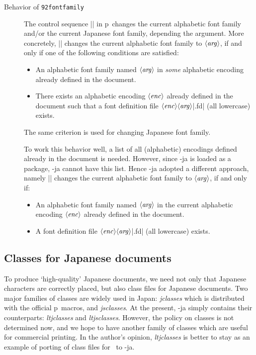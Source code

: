 \documentclass{ajt}
\begin{document}
\begin{description}

\item[Behavior of\/ {\tt\char92fontfamily\/}]
The control sequence |\fontfamily| in p\LaTeXe\ changes the current alphabetic
	   font family and/or the current Japanese font family,
	   depending the argument. More concretely,
	   || changes the
	   current alphabetic font family to $\langle\hbox{\it
	   arg\/}\rangle$, if and only if one of the following
	   conditions are satisfied:
\begin{itemize}
\item An alphabetic font family named $\langle\hbox{\it arg\/}\rangle$ in
      \emph{some} alphabetic encoding already defined in the document.
\item There exists an alphabetic encoding $\langle\hbox{\it
      enc\/}\rangle$ already defined in the document such that a font
      definition file $\langle\hbox{\it enc\/}\rangle\langle\hbox{\it
      arg\/}\rangle$|.fd| (all lowercase) exists.
\end{itemize}
The same criterion is used for changing Japanese font family.

To work this behavior well, a list of all (alphabetic) encodings defined
	   already in the document is needed. However, since \LuaTeX-ja
	   is loaded as a package, \LuaTeX-ja cannot have this list.
	   Hence \LuaTeX-ja adopted a different approach, namely
	   || changes the
	   current alphabetic font family to $\langle\hbox{\it
	   arg\/}\rangle$, if and only if:
\begin{itemize}
\item An alphabetic font family named $\langle\hbox{\it arg\/}\rangle$
      in the current alphabetic encoding $\langle\hbox{\it
      enc\/}\rangle$ already defined in the document.
\item A  font definition file $\langle\hbox{\it enc\/}\rangle\langle\hbox{\it
      arg\/}\rangle$|.fd| (all lowercase) exists.
\end{itemize}


\end{description}



\subsection{Classes for Japanese documents}
To produce `high-quality' Japanese documents, we need not only that
Japanese characters are correctly placed, but also class files for
Japanese documents. Two major families of classes are widely used in Japan:
\emph{jclasses} which is distributed with the official p\LaTeXe\ macros,
and \emph{jsclasses}.  At the present, \LuaTeX-ja
simply contains their counterparts: \emph{ltjclasses} and
\emph{ltjsclasses}. However, the policy on classes is not determined
now, and we hope to have another family of classes which are useful for
commercial printing.  In the author's opinion, \emph{ltjclasses} is
better to stay as an example of porting of class files for \pTeX\ to
\LuaTeX-ja.
\end{document}
